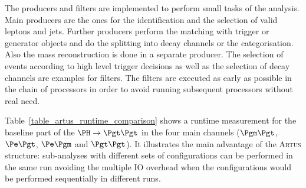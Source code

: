 \documentclass[3p]{elsarticle}
\newcommand{\software}[1]{\textsc{#1}\xspace}
\newcommand{\artus}{\software{Artus}}
\begin{document}
The producers and filters are implemented to perform small tasks of the analysis. Main producers are the ones for the identification and the selection of valid leptons and jets. Further producers perform the matching with trigger or generator objects and do the splitting into decay channels or the categorisation. Also the mass reconstruction is done in a separate producer. The selection of events according to high level trigger decisions as well as the selection of decay channels are examples for filters. The filters are executed as early as possible in the chain of processors in order to avoid running subsequent processors without real need.

Table~\ref{table_artus_runtime_comparison} shows a runtime measurement for the baseline part of the $\PH\to\Pgt\Pgt$ in the four main channels ($\Pgm\Pgt$, $\Pe\Pgt$, $\Pe\Pgm$ and $\Pgt\Pgt$). It illustrates the main advantage of the \artus structure: sub-analyses with different sets of configurations can be performed in the same run avoiding the multiple IO overhead when the configurations would be performed sequentially in different runs.
\end{document}
